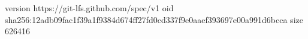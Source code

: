version https://git-lfs.github.com/spec/v1
oid sha256:12adb09fac1f39a1f9384d674ff27fd0cd337f9e0aaef393697e00a991d6bcca
size 626416
